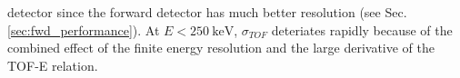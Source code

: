 \documentclass[number,5p]{elsarticle}
\begin{document}
detector since the forward detector has much better resolution (see Sec. \ref{sec:fwd_performance}).
At $E < \SI{250}{\keV}$, $\sigma_{TOF}$ deteriates rapidly because of the
combined effect of the finite energy resolution and the large derivative of the TOF-E relation.
\end{document}
